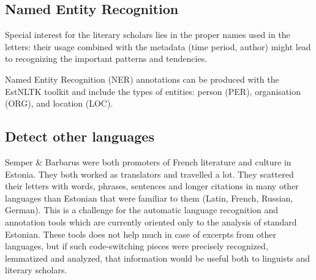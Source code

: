 \documentclass[runningheads]{llncs}
\begin{document}
\subsection{Named Entity Recognition}

Special interest for the literary scholars lies in the proper names used in the letters: their usage combined with the metadata (time period, author) might lead to recognizing the important patterns and tendencies. 

Named Entity Recognition (NER) annotations can be produced with the EstNLTK toolkit and include the types of entities: person (PER), organisation (ORG), and location (LOC). %

\subsection{Detect other languages}

Semper \& Barbarus were both promoters of French literature and culture in Estonia. They both worked as translators and travelled a lot. They scattered their letters with words, phrases, sentences and longer citations in many other languages than Estonian that were familiar to them (Latin, French, Russian, German). This is a challenge for the automatic language recognition and annotation tools which are currently oriented only to the analysis of standard Estonian. These tools does not help much in case of excerpts from other languages, but if such code-switching pieces were precisely recognized, lemmatized and analyzed, that information would be useful both to linguists and literary scholars.
\end{document}

